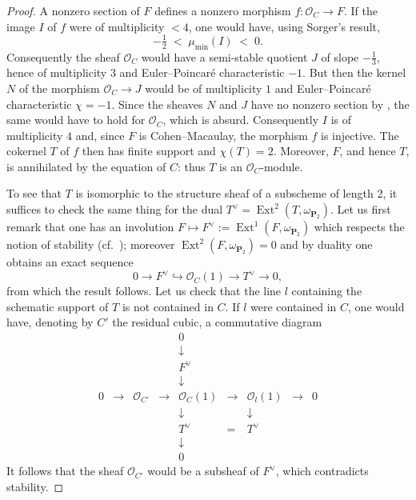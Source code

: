\documentclass[12pt,english]{smfart}%
\theoremstyle{plain}
\theoremstyle{definition}
\theoremstyle{remark}
\newcommand{\PP}{\mathbf{P}}
\newcommand{\Oo}{\mathcal{O}}
\DeclareMathOperator{\Ext}{Ext}
\newcommand{\origpage}[1]{\marginnote{\scriptsize\itshape p.~#1}}
\begin{document}
\begin{proof}
A nonzero section of $F$ defines a nonzero morphism $f:\Oo_C\to F$. If the image $I$ of $f$ were of multiplicity $<4$, one would have, using Sorger's result,
\[
-\tfrac12 \;<\; \mu_{\min}(I)\;<\;0 .
\]
Consequently the sheaf $\Oo_C$ would have a semi-stable quotient $J$ of slope $-\tfrac13$, hence of multiplicity $3$ and Euler--Poincar\'e characteristic $-1$. But then the kernel $N$ of the morphism $\Oo_C\to J$ would be of
\origpage{662}%
multiplicity $1$ and Euler--Poincar\'e characteristic $\chi = -1$. Since the sheaves $N$ and $J$ have no nonzero section by , the same would have to hold for $\Oo_C$, which is absurd. Consequently $I$ is of multiplicity $4$ and, since $F$ is Cohen--Macaulay, the morphism $f$ is injective. The cokernel $T$ of $f$ then has finite support and $\chi(T)=2$. Moreover, $F$, and hence $T$, is annihilated by the equation of $C$: thus $T$ is an $\Oo_C$-module.

To see that $T$ is isomorphic to the structure sheaf of a subscheme of length $2$, it suffices to check the same thing for the dual $T^{\vee}=\Ext^2(T,\omega_{\PP_2})$. Let us first remark that one has an involution $F\mapsto F^{\vee}:=\Ext^1(F,\omega_{\PP_2})$ which respects the notion of stability (cf.\ \cite{Sor}); moreover $\Ext^2(F,\omega_{\PP_2})=0$ and by duality one obtains an exact sequence
\[
0 \longrightarrow F^{\vee}\hookrightarrow \Oo_C(1)\longrightarrow T^{\vee}
\longrightarrow 0,
\]
from which the result follows. Let us check that the line $l$ containing the schematic support of $T$ is not contained in $C$. If $l$ were contained in $C$, one would have, denoting by $C'$ the residual cubic, a commutative diagram
\[
\begin{array}{ccccccccc}
&&&& 0 &&&&\\
&&&& \downarrow &&&&\\
&&&& F^{\vee} &&&&\\
&&&& \downarrow &&&&\\
0 &\to& \Oo_{C'} &\to& \Oo_C(1) &\to& \Oo_l(1) &\to& 0\\
&&&& \downarrow && \downarrow &&\\
&&&& T^{\vee} &=& T^{\vee} &&\\
&&&& \downarrow &&&&\\
&&&& 0 &&&&
\end{array}
\]
It follows that the sheaf $\Oo_{C'}$ would be a subsheaf of $F^{\vee}$, which contradicts stability.
\end{proof}
\end{document}
